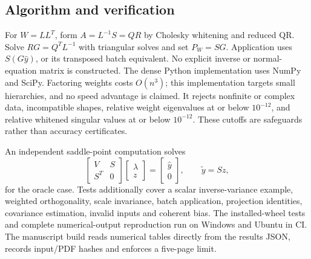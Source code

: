 \documentclass[10pt,a4paper]{article}
\begin{document}
\subsection{Algorithm and verification}
For $W=LL^T$, form $A=L^{-1}S=QR$ by Cholesky whitening and reduced QR.
Solve $RG=Q^TL^{-1}$ with triangular solves and set $P_W=SG$.
Application uses $S(G\hat y)$, or its transposed batch equivalent.
No explicit inverse or normal-equation matrix is constructed. The dense Python
implementation uses NumPy and SciPy. Factoring weights costs $O(n^3)$; this
implementation targets small hierarchies, and no speed advantage is claimed.
It rejects nonfinite or complex data, incompatible shapes, relative weight
eigenvalues at or below $10^{-12}$, and relative whitened singular values at or
below $10^{-12}$. These cutoffs are safeguards rather than accuracy certificates.

An independent saddle-point computation solves
\begin{equation}
 \begin{bmatrix}V&S\\S^T&0\end{bmatrix}
 \begin{bmatrix}\lambda\\z\end{bmatrix}
 =\begin{bmatrix}\hat y\\0\end{bmatrix},\qquad \tilde y=Sz,
 \label{eq:kkt}
\end{equation}
for the oracle case. Tests additionally cover a scalar inverse-variance example,
weighted orthogonality, scale invariance, batch application, projection
identities, covariance estimation, invalid inputs and coherent bias.
The installed-wheel tests and complete numerical-output reproduction run on
Windows and Ubuntu in CI. The manuscript build reads numerical tables directly
from the results JSON, records input/PDF hashes and enforces a five-page limit.
\end{document}

